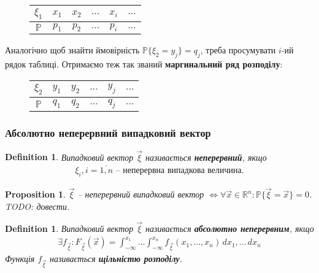 \documentclass[a4paper, 10pt]{article}
\theoremstyle{theoremdd}
\newtheorem{definition}[theorem]{Definition}
\newtheorem{proposition}[theorem]{Proposition}
\begin{document}
\begin{figure}[H]
\centering
\begin{tabular}{c|c|c|c|c|c}
$\xi_1$ & $x_1$ & $x_2$ & $\dots$ & $x_i$ & $\dots$ \\
\hline
$\mathbb{P}$ & $p_1$ & $p_2$ & $\dots$ & $p_i$ & $\dots$
\end{tabular}
\end{figure}
\noindent
Аналогічно щоб знайти ймовірність $\mathbb{P}\{\xi_2 = y_j\} = q_j$, треба просумувати $i$-ий рядок таблиці. Отримаємо теж так званий \textbf{маргинальний ряд розподілу}:
\begin{figure}[H]
\centering
\begin{tabular}{c|c|c|c|c|c}
$\xi_2$ & $y_1$ & $y_2$ & $\dots$ & $y_j$ & $\dots$ \\
\hline
$\mathbb{P}$ & $q_1$ & $q_2$ & $\dots$ & $q_j$ & $\dots$
\end{tabular}
\end{figure}

\subsubsection{Абсолютно неперервний випадковий вектор}
\begin{definition}
Випадковий вектор $\vec{\xi}$ називається \textbf{неперервний}, якщо
\begin{align*}
\xi_i, i = \overline{1,n} \text{ -- неперервна випадкова величина.}
\end{align*}
\end{definition}

\begin{proposition}
$\vec{\xi}$ -- неперервний випадковий вектор $\iff \forall \vec{x} \in \mathbb{R}^n: \mathbb{P}\{\vec{\xi} = \vec{x}\} = 0$.\\
\textit{TODO: довести.}
\end{proposition}

\begin{definition}
Випадковий вектор $\vec{\xi}$ називається \textbf{абсолютно неперервним}, якщо
\begin{align*}
\exists f_{\vec{\xi}} : F_{\vec{\xi}}(\vec{x}) = \int_{-\infty}^{x_1} \dots \int_{-\infty}^{x_n} f_{\vec{\xi}}(x_1,\dots,x_n)\,dx_1,\dots\,dx_n
\end{align*}
Функція $f_{\vec{\xi}}$ називається \textbf{щільністю розподілу}.
\end{definition}
\end{document}
